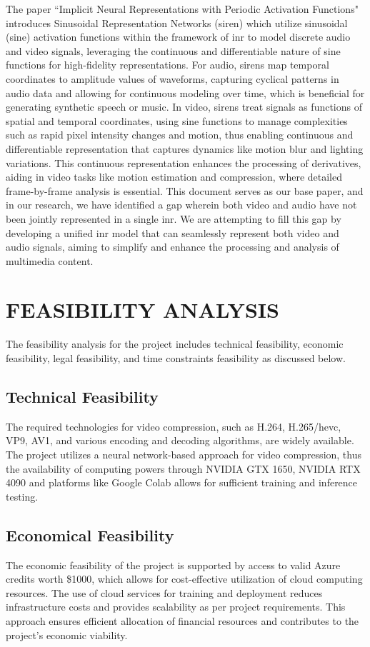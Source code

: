 \documentclass{ioereport}
\begin{document}
The paper ``Implicit Neural Representations with Periodic Activation Functions" \cite{sitzmann2020implicit} introduces Sinusoidal Representation Networks (\gls{siren}) which utilize sinusoidal (sine) activation functions within the framework of \gls{inr} to model discrete audio and video signals, leveraging the continuous and differentiable nature of sine functions for high-fidelity representations. For audio, \gls{siren}s map temporal coordinates to amplitude values of waveforms, capturing cyclical patterns in audio data and allowing for continuous modeling over time, which is beneficial for generating synthetic speech or music. In video, \gls{siren}s treat signals as functions of spatial and temporal coordinates, using sine functions to manage complexities such as rapid pixel intensity changes and motion, thus enabling continuous and differentiable representation that captures dynamics like motion blur and lighting variations. This continuous representation enhances the processing of derivatives, aiding in video tasks like motion estimation and compression, where detailed frame-by-frame analysis is essential. This document serves as our base paper, and in our research, we have identified a gap wherein both video and audio have not been jointly represented in a single \gls{inr}. We are attempting to fill this gap by developing a unified \gls{inr} model that can seamlessly represent both video and audio signals, aiming to simplify and enhance the processing and analysis of multimedia content.

\pagebreak


\section{\MakeUppercase{Feasibility Analysis}}
The feasibility analysis for the project includes technical feasibility, economic feasibility, legal feasibility, and time constraints feasibility as discussed below.
    \subsection{Technical Feasibility}
    The required technologies for video compression, such as H.264, H.265/\gls{hevc}, VP9, AV1, and various encoding and decoding algorithms, are widely available. The project utilizes a neural network-based approach for video compression, thus the availability of computing powers through NVIDIA GTX 1650, NVIDIA RTX 4090 and platforms like Google Colab allows for sufficient training and inference testing.
    \subsection{Economical Feasibility}
    The economic feasibility of the project is supported by access to valid Azure credits worth \$1000, which allows for cost-effective utilization of cloud computing resources. The use of cloud services for training and deployment reduces infrastructure costs and provides scalability as per project requirements. This approach ensures efficient allocation of financial resources and contributes to the project's economic viability.
\end{document}
